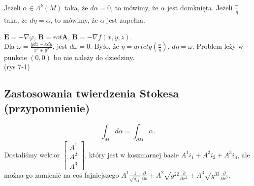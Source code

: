 \documentclass[../main.tex]{subfiles}
\begin{document}
    \begin{definicja}
        Jeżeli $\alpha\in\Lambda^k(M)$ taka, że $d\alpha = 0$, to mówimy, że $\alpha$ jest domknięta. Jeżeli $\underset{\eta}{\exists} $ taka, że $d\eta = \alpha$, to mówimy, że $\alpha$ jest zupełna.
    \end{definicja}
    \begin{przyklad}
        $\mathbf{E} = -\nabla\varphi$, $\mathbf{B} = rot \mathbf{A}$, $\mathbf{B} = -\nabla f(x,y,z)$.\\
        Dla $\omega = \frac{ydx - xdy}{x^2+y^2}$, jest $d\omega = 0$. Było, że $\eta = artctg(\frac{x}{y})$, $d\eta = \omega$. Problem leży w punkcie  $(0,0)$ bo nie należy do dziedziny.\\
        (rys 7-1)
    \end{przyklad}
    \subsection{Zastosowania twierdzenia Stokesa (przypomnienie)}
    \[
    \int_Md\alpha = \int_{\partial M}\alpha
    .\]
Dostaliśmy wektor $\begin{bmatrix} A^1\\A^2\\A^3 \end{bmatrix} $, który jest w koszmarnej bazie $A^1i_1 + A^2i_2 + A^3i_3$, ale można go zamienić na coś fajniejszego $A^1 \frac{1}{\sqrt{g_{11}} }\frac{\partial }{\partial x} + A^2\sqrt{g^{22}} \frac{\partial }{\partial x^2} + A^3 \sqrt{g^{33}}\frac{\partial }{\partial x^3}$.\\
\end{document}
